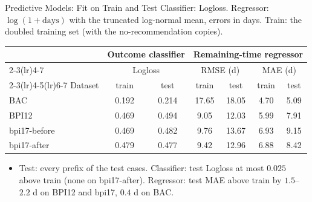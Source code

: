 \documentclass[aspectratio=169]{beamer} %
\begin{document}
\begin{frame}{Predictive Models: Fit on Train and Test}
  \small
  Classifier: Logloss. Regressor: $\log(1+\text{days})$ with the truncated log-normal mean, errors in
  \alert{days}. Train: the doubled training set (with the no-recommendation copies).
  \begin{center}\setlength{\tabcolsep}{5pt}
  \begin{tabular}{lcccccc}
    \toprule
     & \multicolumn{2}{c}{Outcome classifier} & \multicolumn{4}{c}{Remaining-time regressor} \\
    \cmidrule(lr){2-3}\cmidrule(lr){4-7}
     & \multicolumn{2}{c}{Logloss} & \multicolumn{2}{c}{RMSE (d)} & \multicolumn{2}{c}{MAE (d)} \\
    \cmidrule(lr){2-3}\cmidrule(lr){4-5}\cmidrule(lr){6-7}
    Dataset & train & test & train & test & train & test \\
    \midrule
    BAC          & 0.192 & 0.214 & 17.65 & 18.05 & 4.70 & 5.09 \\
    BPI12        & 0.469 & 0.494 &  9.05 & 12.03 & 5.99 & 7.91 \\
    bpi17-before & 0.469 & 0.482 &  9.76 & 13.67 & 6.93 & 9.15 \\
    bpi17-after  & 0.479 & 0.477 &  9.42 & 12.96 & 6.88 & 8.42 \\
    \bottomrule
  \end{tabular}
  \end{center}
  \footnotesize
  \begin{itemize}
    \item Test: every prefix of the test cases. Classifier: test Logloss at most $0.025$ above train (none on
      bpi17-after). Regressor: test MAE above train by $1.5$--$2.2$ d on BPI12 and bpi17, $0.4$ d on BAC.
  \end{itemize}
\end{frame}
\end{document}
